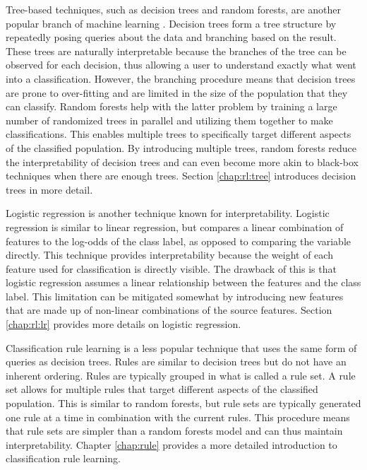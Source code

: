 Tree-based techniques, such as decision trees and random forests, are another popular branch of machine learning \cite{chan2017evidence} \cite{kube2019allocating}. Decision trees form a tree structure by repeatedly posing queries about the data and branching based on the result. These trees are naturally interpretable because the branches of the tree can be observed for each decision, thus allowing a user to understand exactly what went into a classification. However, the branching procedure means that decision trees are prone to over-fitting and are limited in the size of the population that they can classify. Random forests help with the latter problem by training a large number of randomized trees in parallel and utilizing them together to make classifications. This enables multiple trees to specifically target different aspects of the classified population. By introducing multiple trees, random forests reduce the interpretability of decision trees and can even become more akin to black-box techniques when there are enough trees. Section \ref{chap:rl:tree} introduces decision trees in more detail.

Logistic regression is another technique known for interpretability. Logistic regression is similar to linear regression, but compares a linear combination of features to the log-odds of the class label, as opposed to comparing the variable directly. This technique provides interpretability because the weight of each feature used for classification is directly visible. The drawback of this is that logistic regression assumes a linear relationship between the features and the class label. This limitation can be mitigated somewhat by introducing new features that are made up of non-linear combinations of the source features. 
Section \ref{chap:rl:lr} provides more details on logistic regression.

Classification rule learning is a less popular technique that uses the same form of queries as decision trees. Rules are similar to decision trees but do not have an inherent ordering. Rules are typically grouped in what is called a rule set. A rule set allows for multiple rules that target different aspects of the classified population. This is similar to random forests, but rule sets are typically generated one rule at a time in combination with the current rules. This procedure means that rule sets are simpler than a random forests model and can thus maintain interpretability.
Chapter \ref{chap:rule} provides a more detailed introduction to classification rule learning.



